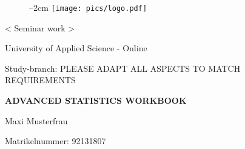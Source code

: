 
\label{titlePage}
\begin{figure}[h]
\centering
\advance\leftskip--2cm
\texttt{[image: pics/logo.pdf]}
\end{figure}
\FloatBarrier

\begin{Large} 
\begin{center}
< Seminar work >
\end{center}
\end{Large} 

\vspace*{5mm}

\begin{large} 
\begin{center}
University of Applied Science - Online
\end{center}
\end{large} 

\begin{large} 
\begin{center}
Study-branch: PLEASE ADAPT ALL ASPECTS TO MATCH REQUIREMENTS
\end{center}
\end{large}

\vspace*{15mm}

\begin{Large} 
\begin{center}
\textbf{ADVANCED STATISTICS WORKBOOK}
\end{center}
\end{Large}

\vspace*{15mm}

\begin{large} 
\begin{center}
Maxi Musterfrau
\end{center}
\end{large} 

\vspace*{-6mm}

\begin{large} 
\begin{center}
Matrikelnummer: 92131807
\end{center}
\end{large} 





